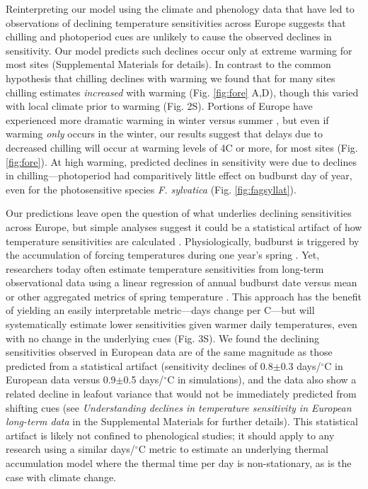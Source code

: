 \documentclass{article}
\begin{document}
\par Reinterpreting our model using the climate and phenology data that have led to observations of declining temperature sensitivities across Europe suggests that chilling and photoperiod cues are unlikely to cause the observed declines in sensitivity. %
Our model predicts such declines occur only at extreme warming for most sites (Supplemental Materials for details). In contrast to the common hypothesis that chilling declines with warming we found that for many sites chilling estimates \emph{increased} with warming (Fig. \ref{fig:fore} A,D), though this varied with local climate prior to warming (Fig. 2S). 
Portions of Europe have experienced more dramatic warming in winter versus summer \cite{balling1998}, but even if warming \emph{only} occurs in the winter, our results suggest that delays due to decreased chilling will occur at warming levels of 4\degree C or more, for most sites (Fig. \ref{fig:fore}). At high warming, predicted declines in sensitivity were due to declines in chilling---photoperiod had comparitively little effect on budburst day of year, even for the photosensitive species \emph{F. sylvatica} (Fig. \ref{fig:fagsyllat}). 

\par Our predictions leave open the question of what underlies declining sensitivities across Europe, but simple analyses suggest it could be a statistical artifact of how temperature sensitivities are calculated \citep{vitasse2018,gusewell2017}. Physiologically, budburst is triggered by the accumulation of forcing temperatures during one year's spring \citep{hanninen1995,chuine2016}. Yet, researchers today often estimate temperature sensitivities from long-term observational data using a linear regression of annual budburst date versus mean or other aggregated metrics of spring temperature \citep[e.g.,][]{Wolkovich:2012n}. This approach has the benefit of yielding an easily interpretable metric---days change per \degree C---but will systematically estimate lower sensitivities given warmer daily temperatures, even with no change in the underlying cues (Fig. 3S). We found the declining sensitivities observed in European data are of the same magnitude as those predicted from a statistical artifact (sensitivity declines of 0.8$\pm$0.3 days/$^{\circ}$C in European data versus 0.9$\pm$0.5 days/$^{\circ}$C in simulations), and the data also show a related decline in leafout variance that would not be immediately predicted from shifting cues (see \emph{Understanding declines in temperature sensitivity in European long-term data} in the Supplemental Materials for further details). This statistical artifact is likely not confined to phenological studies; it should apply to any research using a similar days/$^{\circ}$C metric to estimate an underlying thermal accumulation model where the thermal time per day is non-stationary, as is the case with climate change. 
\end{document}
